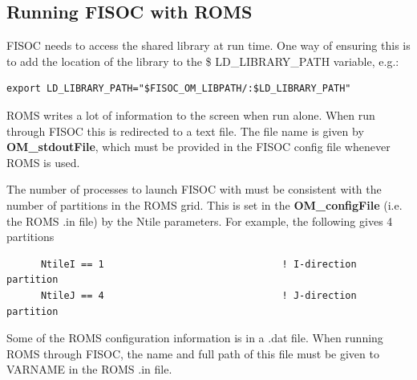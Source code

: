 \documentclass[11pt]{article}
\begin{document}
\subsection{Running FISOC with ROMS}
\label{sec:runningROMS}

FISOC needs to access the shared library at run time.  One way of ensuring this 
is to add the location of the library to the \$ LD\_LIBRARY\_PATH variable, e.g.:
\begin{lstlisting}
export LD_LIBRARY_PATH="$FISOC_OM_LIBPATH/:$LD_LIBRARY_PATH"
\end{lstlisting}

ROMS writes a lot of information to the screen when run alone.  
When run through FISOC this is redirected to a text file. 
The file name is given by \textbf{OM\_stdoutFile}, 
which must be provided in the FISOC config file 
whenever ROMS is used.

The number of processes to launch FISOC with must be consistent with the number of 
partitions in the ROMS grid.  This is set in the \textbf{OM\_configFile} (i.e. the ROMS .in file) by the 
Ntile parameters.  For example, the following gives 4 partitions
\begin{lstlisting}
      NtileI == 1                               ! I-direction partition
      NtileJ == 4                               ! J-direction partition
\end{lstlisting}

Some of the ROMS configuration information is in a .dat file.
When running ROMS through FISOC, the name and full path of this file must be given to VARNAME in the ROMS .in file.
\end{document}
